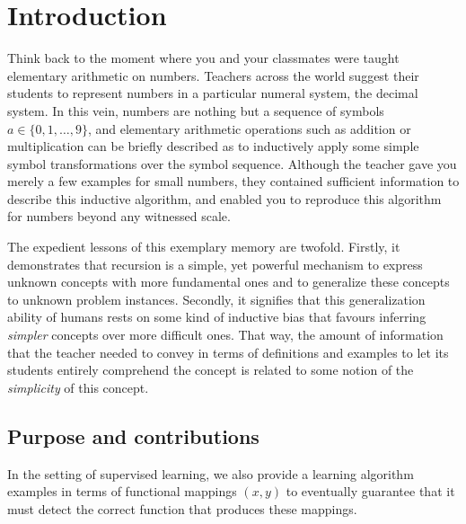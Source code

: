 

\chapter{Introduction} 
Think back to the moment where you and your classmates were taught elementary arithmetic on numbers.
Teachers across the world suggest their students to represent numbers in a particular numeral system, the decimal system.
In this vein, numbers are nothing but a sequence of symbols $a\in\{0,1,\dots,9\}$, and elementary arithmetic operations such as addition or multiplication can be briefly described as to inductively apply some simple symbol transformations over the symbol sequence.
Although the teacher gave you merely a few examples for small numbers, they contained sufficient information to describe this inductive algorithm, and enabled you to reproduce this algorithm for numbers beyond any witnessed scale.

The expedient lessons of this exemplary memory are twofold.
Firstly, it demonstrates that recursion is a simple, yet powerful mechanism to express unknown concepts with more fundamental ones and to generalize these concepts to unknown problem instances.
Secondly, it signifies that this generalization ability of humans rests on some kind of inductive bias that favours inferring \textit{simpler} concepts over more difficult ones.
That way, the amount of information that the teacher needed to convey in terms of definitions and examples to let its students entirely comprehend the concept is related to some notion of the \textit{simplicity} of this concept.


\section{Purpose and contributions}
In the setting of supervised learning, we also provide a learning algorithm examples in terms of functional mappings $(x,y)$ to eventually guarantee that it must detect the correct function that produces these mappings.

